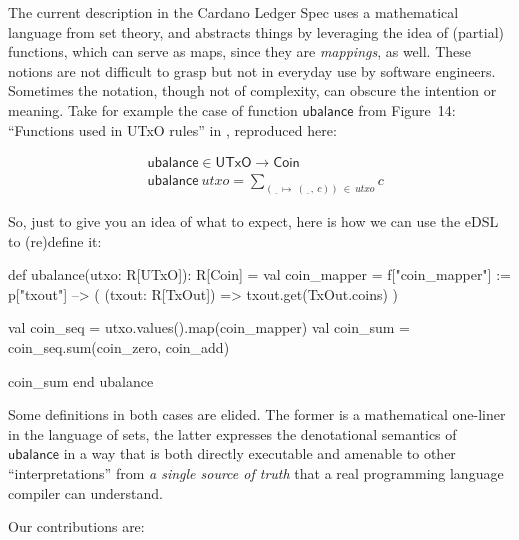 \documentclass[11pt]{article}
\newcommand{\uempty}[1][x]{\underline{\phantom{#1}}}
\begin{document}
The current description in the Cardano Ledger Spec uses a mathematical language from set theory, and abstracts things by leveraging the idea of (partial) functions, which can serve as maps, since  they are \textit{mappings}, as well. These notions are not difficult to grasp but not in everyday use by software engineers. Sometimes the notation, though not of complexity, can obscure the intention or meaning. Take for example the case of function $\mathsf{ubalance}$ from Figure~14: ``Functions used in UTxO rules'' in \cite{cardano:ledger-spec:shelley:2019}, reproduced here:
  
\begin{align*}
  & \mathsf{ubalance} \in \mathsf{UTxO} \to \mathsf{Coin} \\
  & \mathsf{ubalance} ~ \textit{utxo} = \sum_{(\uempty  \mapsto ~ (\uempty, ~c)) ~ \in ~ \textit{utxo}} c
\end{align*}

\noindent So, just to give you an idea of what to expect, here is how we can use the eDSL to (re)define it:

\begin{ScalaBlockSimple}
def ubalance(utxo: R[UTxO]): R[Coin] =
  val coin_mapper = f["coin_mapper"] :=
    p["txout"] --> ( (txout: R[TxOut]) => txout.get(TxOut.coins) )

  val coin_seq  = utxo.values().map(coin_mapper)
  val coin_sum  = coin_seq.sum(coin_zero, coin_add)

  coin_sum
end ubalance
\end{ScalaBlockSimple}

\noindent Some definitions in both cases are elided. The former is a mathematical one-liner in the language of sets, the latter expresses the denotational semantics of $\mathsf{ubalance}$ in a way that is both directly executable and amenable to other ``interpretations'' from \textit{a single source of truth} that a real programming language compiler can understand. 

Our contributions are:
\end{document}
